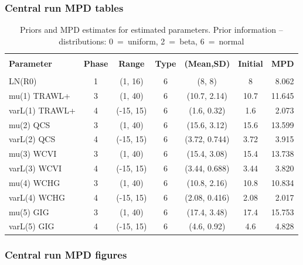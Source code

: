 \subsubsection{Central run MPD tables}


\setlength{\tabcolsep}{4pt}
\begin{table}[!h]
\centering
\caption{Priors and MPD estimates for estimated parameters. Prior information -- distributions: 0~=~uniform, 2~=~beta, 6~=~normal}
\label{tab:parest}
\usefont{\encodingdefault}{\familydefault}{\seriesdefault}{\shapedefault}\small
\begin{tabular}{lcccccr}
\hline \\ [-1.5ex]
{\bf Parameter} & {\bf Phase} & {\bf Range} & {\bf Type} & {\bf (Mean,SD)} & {\bf Initial} & {\bf MPD} \\ [1ex]
\hline \\ [-1.5ex]
LN(R0) & 1 & (1, 16) & 6 & (8, 8) & 8 & 8.062 \\
mu(1) TRAWL+ & 3 & (1, 40) & 6 & (10.7, 2.14) & 10.7 & 11.645 \\
varL(1) TRAWL+ & 4 & (-15, 15) & 6 & (1.6, 0.32) & 1.6 & 2.073 \\
mu(2) QCS & 3 & (1, 40) & 6 & (15.6, 3.12) & 15.6 & 13.599 \\
varL(2) QCS & 4 & (-15, 15) & 6 & (3.72, 0.744) & 3.72 & 3.915 \\
mu(3) WCVI & 3 & (1, 40) & 6 & (15.4, 3.08) & 15.4 & 13.738 \\
varL(3) WCVI & 4 & (-15, 15) & 6 & (3.44, 0.688) & 3.44 & 3.820 \\
mu(4) WCHG & 3 & (1, 40) & 6 & (10.8, 2.16) & 10.8 & 10.834 \\
varL(4) WCHG & 4 & (-15, 15) & 6 & (2.08, 0.416) & 2.08 & 2.017 \\
mu(5) GIG & 3 & (1, 40) & 6 & (17.4, 3.48) & 17.4 & 15.753 \\
varL(5) GIG & 4 & (-15, 15) & 6 & (4.6, 0.92) & 4.6 & 4.828 \\
\hline
\end{tabular}
\usefont{\encodingdefault}{\familydefault}{\seriesdefault}{\shapedefault}\normalsize
\end{table}

\newpage
\subsubsection{Central run MPD figures}


